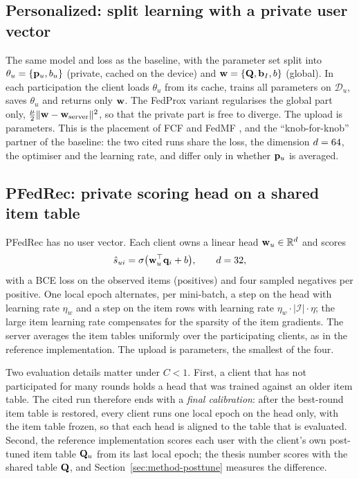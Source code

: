 \subsection{Personalized: split learning with a private user vector}
\label{sec:method-personalized}

The same model and loss as the baseline, with the parameter set split into
$\theta_u = \{\mathbf{p}_u, b_u\}$ (private, cached on the device) and $\mathbf{w} = \{\mathbf{Q}, \mathbf{b}_I,
b\}$ (global). In each participation the client loads $\theta_u$ from its cache, trains all
parameters on $\mathcal{D}_u$, saves $\theta_u$ and returns only $\mathbf{w}$. The FedProx variant
regularises the global part only, $\frac{\mu}{2}\|\mathbf{w} - \mathbf{w}_{\text{server}}\|^2$, so
that the private part is free to diverge. The upload is \ParamsSplitGlobal{} parameters. This
is the placement of FCF and FedMF \cite{ammaduddin2019fcf,chai2021fedmf}, and the
``knob-for-knob'' partner of the baseline: the two cited runs share the loss, the dimension
$d=64$, the optimiser and the learning rate, and differ only in whether $\mathbf{p}_u$ is averaged.

\subsection{PFedRec: private scoring head on a shared item table}
\label{sec:method-pfedrec}

PFedRec \cite{zhang2023pfedrec} has no user vector. Each client owns a linear head
$\mathbf{w}_u \in \mathbb{R}^{d}$ and scores
\begin{equation}
  \hat{s}_{ui} = \sigma\big(\mathbf{w}_u^\top \mathbf{q}_i + b\big), \qquad d=32,
  \label{eq:pfedrec}
\end{equation}
with a BCE loss on the observed items (positives) and four sampled negatives per positive. One
local epoch alternates, per mini-batch, a step on the head with learning rate $\eta_w$ and a
step on the item rows with learning rate $\eta_w \cdot |\mathcal{I}| \cdot \eta$; the large item
learning rate compensates for the sparsity of the item gradients. The server averages the item
tables uniformly over the participating clients, as in the reference implementation. The upload
is \ParamsPfedrecGlobal{} parameters, the smallest of the four.

Two evaluation details matter under $C<1$. First, a client that has not participated for many
rounds holds a head that was trained against an older item table. The cited run therefore ends
with a \emph{final calibration}: after the best-round item table is restored, every client runs
one local epoch on the head only, with the item table frozen, so that each head is aligned to
the table that is evaluated. Second, the reference implementation scores each user with the
client's own post-tuned item table $\mathbf{Q}_u$ from its last local epoch; the thesis number scores
with the shared table $\mathbf{Q}$, and Section~\ref{sec:method-posttune} measures the difference.

